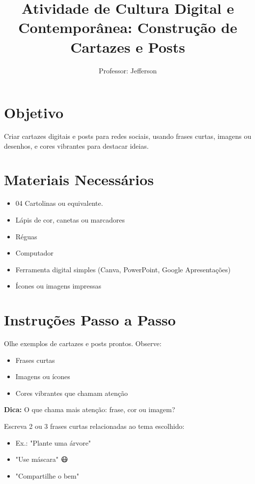 \documentclass[12pt]{article}
\title{\textcolor{titleblue}{Atividade de Cultura Digital e Contemporânea: Construção de Cartazes e Posts}}
\author{Professor: Jefferson}
\date{}
\begin{document}
\maketitle
\vspace{-0.5cm}


\section*{Objetivo}
Criar cartazes digitais e posts para redes sociais, usando frases curtas, imagens ou desenhos, e cores vibrantes para destacar ideias.

\section*{Materiais Necessários}
\begin{itemize}
    \item 04 Cartolinas ou equivalente.
    \item Lápis de cor, canetas ou marcadores
    \item Réguas
    \item Computador 
    \item Ferramenta digital simples (Canva, PowerPoint, Google Apresentações)
    \item Ícones ou imagens impressas
\end{itemize}

\section*{Instruções Passo a Passo}

\begin{tcolorbox}[colback=topic1,colframe=titleblue,title=Tópico 1: Observação de Exemplos:,sharp corners, boxrule=0.8pt]
Olhe exemplos de cartazes e posts prontos. Observe:
\begin{itemize}
    \item Frases curtas
    \item Imagens ou ícones
    \item Cores vibrantes que chamam atenção
\end{itemize}
\textbf{Dica:} O que chama mais atenção: frase, cor ou imagem?
\end{tcolorbox}

\begin{tcolorbox}[colback=topic2,colframe=titleblue,title=Tópico 2: Criação de Frases Curtas:,sharp corners, boxrule=0.8pt]
Escreva 2 ou 3 frases curtas relacionadas ao tema escolhido:
\begin{itemize}
    \item Ex.: "Plante uma árvore" 🌳
    \item "Use máscara" 😷
    \item "Compartilhe o bem" 🤝
\end{itemize}
\end{tcolorbox}
\end{document}
